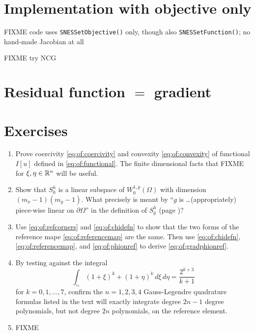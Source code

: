 \section{Implementation with objective only}

FIXME code uses \texttt{SNESSetObjective()} only, though also \texttt{SNESSetFunction()}; no hand-made Jacobian at all

FIXME try NCG






\section{Residual function $=$ gradient}



\section{Exercises}

\renewcommand{\labelenumi}{\arabic{chapter}.\arabic{enumi}\quad}
\renewcommand{\labelenumii}{(\alph{enumii})}
\begin{enumerate}
\item Prove coercivity \eqref{eq:of:coercivity} and convexity \eqref{eq:of:convexity} of functional $I[u]$ defined in \eqref{eq:of:functional}.  The finite dimensional facts that FIXME for $\xi,\eta\in\mathbb{R}^n$ will be useful.

\item Show that $S_0^h$ is a linear subspace of $W_0^{1,p}(\Omega)$ with dimension $(m_x-1)(m_y-1)$.  What precisely is meant by ``$g$ is \dots (appropriately) piece-wise linear on $\partial\Omega$'' in the definition of $S_g^h$ (page \pageref{eq:of:Sghdefn})?

\item  Use \eqref{eq:of:refcorners} and \eqref{eq:of:chidefn} to show that the two forms of the reference mape \eqref{eq:of:referencemap} are the same.  Then use \eqref{eq:of:chidefn}, \eqref{eq:of:referencemap}, and \eqref{eq:of:phionref} to derive \eqref{eq:of:gradphionref}.

\item By testing against the integral
    $$\int_{\square_\ast} (1+\xi)^k + (1+\eta)^k\,d\xi\, d\eta = \frac{2^{k+3}}{k+1}$$
for $k=0,1,\dots,7$, confirm the $n=1,2,3,4$ Gauss-Legendre quadrature formulas listed in the text will exactly integrate degree $2n-1$ degree polynomials, but not degree $2n$ polynomials, on the reference element.

\item FIXME
\end{enumerate}
